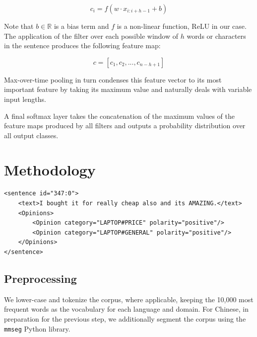 \documentclass[11pt,letterpaper]{article}
\begin{document}
\begin{equation} \label{eq:featuremap}
c_i = f(w \cdot x_{i:i+h-1} + b) 
\end{equation}

Note that $b \in \mathbb{R}$ is a bias term and $f$ is a non-linear function, ReLU \cite{Nair2010} in our case. The application of the filter over each possible window of $h$ words or characters in the sentence produces the following feature map:

\begin{equation} 
c = [c_1, c_2, ..., c_{n-h+1}]
\end{equation}

Max-over-time pooling in turn condenses this feature vector to its most important feature by taking its maximum value and naturally deals with variable input lengths.

A final softmax layer takes the concatenation of the maximum values of the feature maps produced by all filters and outputs a probability distribution over all output classes.

\section{Methodology}


\begin{lstlisting}[float=*]
<sentence id="347:0">
    <text>I bought it for really cheap also and its AMAZING.</text>
    <Opinions>
        <Opinion category="LAPTOP#PRICE" polarity="positive"/>
        <Opinion category="LAPTOP#GENERAL" polarity="positive"/>
    </Opinions>
</sentence>
\end{lstlisting}

\subsection{Preprocessing}

We lower-case and tokenize the corpus, where applicable, keeping the 10,000 most frequent words as the vocabulary for each language and domain. For Chinese, in preparation for the previous step, we additionally segment the corpus using the \texttt{mmseg} Python library. 
\end{document}
